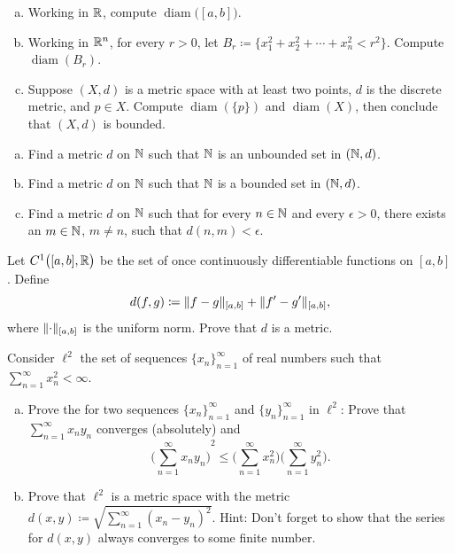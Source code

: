 \begin{exercise}
\pagebreak[2]
\leavevmode
\begin{enumerate}[a)]
\item
Working in ${\mathbb{R}}$, compute $\operatorname{diam}\bigl([a,b]\bigr)$.
\item
Working in ${\mathbb{R}}^n$, for every $r > 0$, let $B_r \coloneqq \{ x_1^2+x_2^2+\cdots+x_n^2
< r^2 \}$.  Compute $\operatorname{diam}(B_r)$.
\item
Suppose $(X,d)$ is a metric space with at least two points,
$d$ is the discrete metric, and $p \in X$.
Compute
$\operatorname{diam}(\{ p \})$ and $\operatorname{diam}(X)$,
then conclude that $(X,d)$ is bounded.
\end{enumerate}
\end{exercise}

\begin{exercise}
\pagebreak[2]
\leavevmode
\begin{enumerate}[a)]
\item
Find a metric $d$ on ${\mathbb{N}}$ such that ${\mathbb{N}}$ is an unbounded set in $({\mathbb{N}},d)$.
\item
Find a metric $d$ on ${\mathbb{N}}$ such that ${\mathbb{N}}$ is a bounded set in $({\mathbb{N}},d)$.
\item
Find a metric $d$ on ${\mathbb{N}}$ such that for every $n \in {\mathbb{N}}$ and every $\epsilon > 0$,
there exists an $m \in {\mathbb{N}}$, $m \neq n$, such that $d(n,m) < \epsilon$.
\end{enumerate}
\end{exercise}

\begin{exercise} \label{exercise:C1ab}
Let $C^1\bigl([a,b],{\mathbb{R}}\bigr)$ be the set of once continuously differentiable
functions on $[a,b]$.
Define
\begin{equation*}
d(f,g) \coloneqq \lVert {f-g} \rVert_{[a,b]} + \lVert {f'-g'} \rVert_{[a,b]},
\end{equation*}
where $\lVert {\cdot} \rVert_{[a,b]}$ is the uniform norm.  Prove that $d$ is a metric.
\end{exercise}

\begin{samepage}
\begin{exercise}
Consider $\ell^2$ the set of sequences $\{ x_n \}_{n=1}^\infty$
of real numbers
such that $\sum_{n=1}^\infty x_n^2 < \infty$.
\begin{enumerate}[a)]
\item
Prove the  for two sequences
$\{x_n \}_{n=1}^\infty$ and $\{ y_n \}_{n=1}^\infty$ in $\ell^2$:  Prove that
$\sum_{n=1}^\infty x_n y_n$ converges (absolutely) and
\begin{equation*}
{\biggl( \sum_{n=1}^\infty x_n y_n \biggr)}^2
\leq
\biggl(\sum_{n=1}^\infty x_n^2 \biggr)
\biggl(\sum_{n=1}^\infty y_n^2 \biggr) .
\end{equation*}
\item
Prove that $\ell^2$ is a metric space with the metric
$d(x,y) \coloneqq \sqrt{\sum_{n=1}^\infty {(x_n-y_n)}^2}$.
Hint: Don't forget to show that the series for $d(x,y)$ always converges
to some finite number.
\end{enumerate}
\end{exercise}
\end{samepage}


